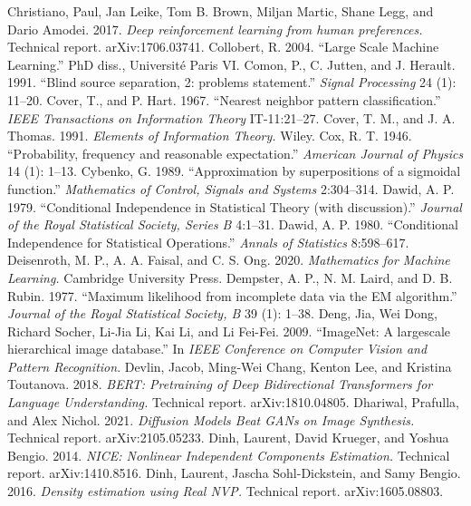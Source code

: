  Christiano, Paul, Jan Leike, Tom B. Brown, Miljan Martic, Shane Legg, and Dario Amodei. 2017. \emph{Deep reinforcement learning from human preferences.} Technical report. arXiv:1706.03741.
 Collobert, R. 2004. ``Large Scale Machine Learning.'' PhD diss., Universit\'e Paris VI.
 Comon, P., C. Jutten, and J. Herault. 1991. ``Blind source separation, 2: problems statement.'' \emph{Signal Processing} 24 (1): 11--20.
 Cover, T., and P. Hart. 1967. ``Nearest neighbor pattern classification.'' \emph{IEEE Transactions on Information Theory} IT-11:21--27.
 Cover, T. M., and J. A. Thomas. 1991. \emph{Elements of Information Theory.} Wiley.
 Cox, R. T. 1946. ``Probability, frequency and reasonable expectation.'' \emph{American Journal of Physics} 14 (1): 1--13.
 Cybenko, G. 1989. ``Approximation by superpositions of a sigmoidal function.'' \emph{Mathematics of Control, Signals and Systems} 2:304--314.
 Dawid, A. P. 1979. ``Conditional Independence in Statistical Theory (with discussion).'' \emph{Journal of the Royal Statistical Society, Series B} 4:1--31.
 Dawid, A. P. 1980. ``Conditional Independence for Statistical Operations.'' \emph{Annals of Statistics} 8:598--617.
 Deisenroth, M. P., A. A. Faisal, and C. S. Ong. 2020. \emph{Mathematics for Machine Learning.} Cambridge University Press.
 Dempster, A. P., N. M. Laird, and D. B. Rubin. 1977. ``Maximum likelihood from incomplete data via the EM algorithm.'' \emph{Journal of the Royal Statistical Society, B} 39 (1): 1--38.
 Deng, Jia, Wei Dong, Richard Socher, Li-Jia Li, Kai Li, and Li Fei-Fei. 2009. ``ImageNet: A largescale hierarchical image database.'' In \emph{IEEE Conference on Computer Vision and Pattern Recognition}.
 Devlin, Jacob, Ming-Wei Chang, Kenton Lee, and Kristina Toutanova. 2018. \emph{BERT: Pretraining of Deep Bidirectional Transformers for Language Understanding.} Technical report. arXiv:1810.04805.
 Dhariwal, Prafulla, and Alex Nichol. 2021. \emph{Diffusion Models Beat GANs on Image Synthesis.} Technical report. arXiv:2105.05233.
 Dinh, Laurent, David Krueger, and Yoshua Bengio. 2014. \emph{NICE: Nonlinear Independent Components Estimation.} Technical report. arXiv:1410.8516.
 Dinh, Laurent, Jascha Sohl-Dickstein, and Samy Bengio. 2016. \emph{Density estimation using Real NVP.} Technical report. arXiv:1605.08803.
